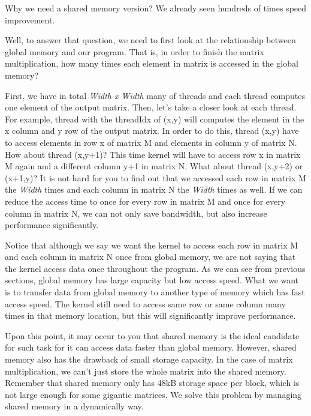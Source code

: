 \documentclass[letterpaper,10pt,openany,oneside]{sphinxmanual}
\begin{document}
Why we need a shared memory version? We already seen hundreds of times speed improvement.

Well, to answer that question, we need to first look at the relationship between global memory and our program. That is, in order to finish the matrix multiplication, how many times each element in matrix is accessed in the global memory?

First, we have in total \emph{Width x Width} many of threads and each thread computes one element of the output matrix. Then, let's take a closer look at each thread. For example, thread with the threadIdx of (x,y) will computes the element in the x column and y row of the output matrix. In order to do this, thread (x,y) have to access elements in row x of matrix M and elements in column y of matrix N. How about thread (x,y+1)? This time kernel will have to access row x in matrix M again and a different column y+1 in matrix N. What about thread (x,y+2) or (x+1,y)? It is not hard for you to find out that we accessed each row in matrix M the \emph{Width} times and each column in matrix N the \emph{Width} times as well. If we can reduce the access time to once for every row in matrix M and once for every column in matrix N, we can not only save bandwidth, but also increase performance significantly.

Notice that although we say we want the kernel to access each row in matrix M and each column in matrix N once from global memory, we are not saying that the kernel access data once throughout the program. As we can see from previous sections, global memory has large capacity but low access speed. What we want is to transfer data from global memory to another type of memory which has fast access speed. The kernel still need to access same row or same column many times in that memory location, but this will significantly improve performance.

Upon this point, it may occur to you that shared memory is the ideal candidate for such task for it can access data faster than global memory. However, shared memory also has the drawback of small storage capacity. In the case of matrix multiplication, we can't just store the whole matrix into the shared memory. Remember that shared memory only has 48kB storage space per block, which is not large enough for some gigantic matrices. We solve this problem by managing shared memory in a dynamically way.
\end{document}
